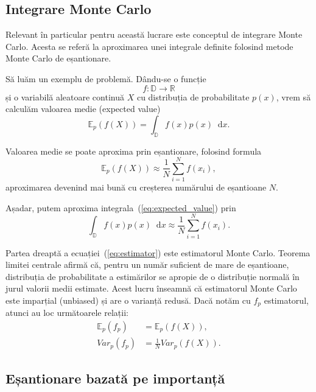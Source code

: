 \documentclass[12pt,a4paper]{report}
\newcommand*\diff{\mathop{}\!\mathrm{d}}
\numberwithin{equation}{section} %
\begin{document}
\subsection{Integrare Monte Carlo}

Relevant în particular pentru această lucrare este conceptul de integrare Monte Carlo.
Acesta se referă la aproximarea unei integrale definite folosind metode Monte Carlo
de eșantionare.

Să luăm un exemplu de problemă. Dându-se o funcție $$f: \mathbb{D} \to \mathbb{R}$$
și o variabilă aleatoare continuă $X$ cu distribuția de probabilitate $p(x)$, vrem să calculăm
valoarea medie (expected value)
\begin{equation}\label{eq:expected_value}
	\mathbb{E}_p(f(X)) = \int_{\mathbb{D}} f(x) p(x)\diff x.
\end{equation}

Valoarea medie se poate aproxima prin eșantionare, folosind formula
\begin{equation}
	\mathbb{E}_p(f(X)) \approx \frac{1}{N} \sum_{i=1}^{N} f(x_i),
\end{equation}
aproximarea devenind mai bună cu creșterea numărului de eșantioane $N$.

Așadar, putem aproxima integrala~(\ref{eq:expected_value}) prin
\begin{equation}\label{eq:estimator}
	\int_{\mathbb{D}} f(x) p(x)\diff x \approx \frac{1}{N} \sum_{i=1}^{N} f(x_i).
\end{equation}

Partea dreaptă a ecuației~(\ref{eq:estimator}) este estimatorul Monte Carlo.
Teorema limitei centrale afirmă că, pentru un număr suficient de mare de eșantioane,
distribuția de probabilitate a estimărilor se apropie de o distribuție normală în
jurul valorii medii estimate. Acest lucru înseamnă că estimatorul Monte
Carlo este imparțial (unbiased) și are o varianță redusă. Dacă notăm cu $f_p$
estimatorul, atunci au loc următoarele relații:
\begin{equation}
	\begin{aligned}
		\mathbb{E}_p(f_p) & = \mathbb{E}_p(f(X)),     \\
		Var_p(f_p)        & = \frac{1}{N}Var_p(f(X)).
	\end{aligned}
\end{equation}

\subsection{Eșantionare bazată pe importanță}\label{sec:is}
\end{document}
